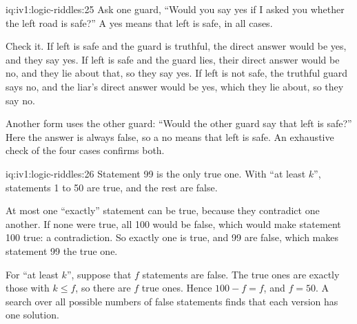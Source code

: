\begin{solution}{iq:iv1:logic-riddles:25}
Ask one guard, ``Would you say yes if I asked you whether the left road is safe?'' A yes means that left is safe, in all cases.

Check it. If left is safe and the guard is truthful, the direct answer would be yes, and they say yes. If left is safe and the guard lies, their direct answer would be no, and they lie about that, so they say yes. If left is not safe, the truthful guard says no, and the liar's direct answer would be yes, which they lie about, so they say no.

Another form uses the other guard: ``Would the other guard say that left is safe?'' Here the answer is always false, so a no means that left is safe. An exhaustive check of the four cases confirms both.

\end{solution}

\begin{solution}{iq:iv1:logic-riddles:26}
Statement 99 is the only true one. With ``at least $k$'', statements 1 to 50 are true, and the rest are false.

At most one ``exactly'' statement can be true, because they contradict one another. If none were true, all 100 would be false, which would make statement 100 true: a contradiction. So exactly one is true, and 99 are false, which makes statement 99 the true one.

For ``at least $k$'', suppose that $f$ statements are false. The true ones are exactly those with $k \le f$, so there are $f$ true ones. Hence $100 - f = f$, and $f = 50$. A search over all possible numbers of false statements finds that each version has one solution.

\end{solution}


